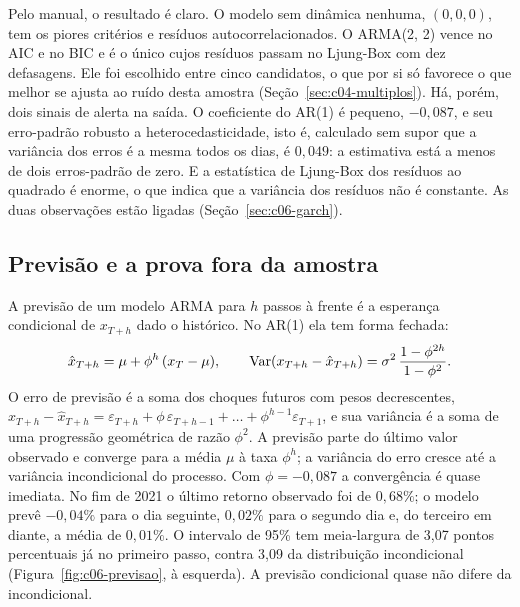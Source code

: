 Pelo manual, o resultado é claro. O modelo sem dinâmica nenhuma, $(0, 0, 0)$, tem os piores critérios e resíduos autocorrelacionados. O ARMA(2, 2) vence no AIC e no BIC e é o único cujos resíduos passam no Ljung-Box com dez defasagens. Ele foi escolhido entre cinco candidatos, o que por si só favorece o que melhor se ajusta ao ruído desta amostra (Seção~\ref{sec:c04-multiplos}). Há, porém, dois sinais de alerta na saída. O coeficiente do AR(1) é pequeno, $-0,087$, e seu erro-padrão robusto a heterocedasticidade, isto é, calculado sem supor que a variância dos erros é a mesma todos os dias, é $0,049$: a estimativa está a menos de dois erros-padrão de zero. E a estatística de Ljung-Box dos resíduos ao quadrado é enorme, o que indica que a variância dos resíduos não é constante. As duas observações estão ligadas (Seção~\ref{sec:c06-garch}).

\subsection{Previsão e a prova fora da amostra}

A previsão de um modelo ARMA para $h$ passos à frente é a esperança condicional de $x_{T+h}$ dado o histórico. No AR(1) ela tem forma fechada:
\begin{equation}
  \hat x_{T+h} = \mu + \phi^h\,(x_T - \mu) , \qquad
  \operatorname{Var}(x_{T+h} - \hat x_{T+h}) = \sigma^2\,\frac{1 - \phi^{2h}}{1-\phi^2} .
  \label{eq:c06-prev}
\end{equation}
O erro de previsão é a soma dos choques futuros com pesos decrescentes, $x_{T+h} - \hat x_{T+h} = \varepsilon_{T+h} + \phi\,\varepsilon_{T+h-1} + \dots + \phi^{h-1}\varepsilon_{T+1}$, e sua variância é a soma de uma progressão geométrica de razão $\phi^2$. A previsão parte do último valor observado e converge para a média $\mu$ à taxa $\phi^h$; a variância do erro cresce até a variância incondicional do processo. Com $\phi = -0,087$ a convergência é quase imediata. No fim de 2021 o último retorno observado foi de $0,68\%$; o modelo prevê $-0,04\%$ para o dia seguinte, $0,02\%$ para o segundo dia e, do terceiro em diante, a média de $0,01\%$. O intervalo de 95\% tem meia-largura de 3,07 pontos percentuais já no primeiro passo, contra 3,09 da distribuição incondicional (Figura~\ref{fig:c06-previsao}, à esquerda). A previsão condicional quase não difere da incondicional.

